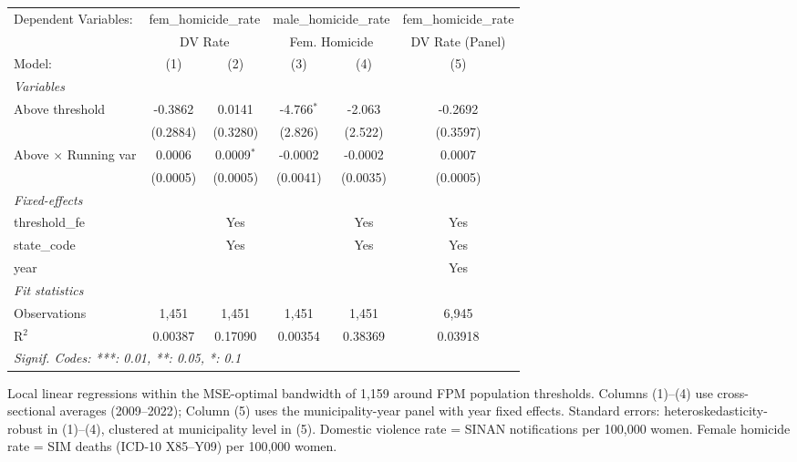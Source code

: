 
\begingroup
\centering
\begin{tabular}{lccccc}
   \tabularnewline \midrule \midrule
   Dependent Variables: & \multicolumn{2}{c}{fem\_homicide\_rate} & \multicolumn{2}{c}{male\_homicide\_rate} & fem\_homicide\_rate\\
    & \multicolumn{2}{c}{DV Rate} & \multicolumn{2}{c}{Fem. Homicide} & DV Rate (Panel) \\ 
   Model:                      & (1)      & (2)          & (3)          & (4)      & (5)\\  
   \midrule
   \emph{Variables}\\
   Above threshold             & -0.3862  & 0.0141       & -4.766$^{*}$ & -2.063   & -0.2692\\   
                               & (0.2884) & (0.3280)     & (2.826)      & (2.522)  & (0.3597)\\   
   Above $\times$ Running var  & 0.0006   & 0.0009$^{*}$ & -0.0002      & -0.0002  & 0.0007\\   
                               & (0.0005) & (0.0005)     & (0.0041)     & (0.0035) & (0.0005)\\   
   \midrule
   \emph{Fixed-effects}\\
   threshold\_fe               &          & Yes          &              & Yes      & Yes\\  
   state\_code                 &          & Yes          &              & Yes      & Yes\\  
   year                        &          &              &              &          & Yes\\  
   \midrule
   \emph{Fit statistics}\\
   Observations                & 1,451    & 1,451        & 1,451        & 1,451    & 6,945\\  
   R$^2$                       & 0.00387  & 0.17090      & 0.00354      & 0.38369  & 0.03918\\  
   \midrule \midrule
   \multicolumn{6}{l}{\emph{Signif. Codes: ***: 0.01, **: 0.05, *: 0.1}}\\
\end{tabular}
 
\par \raggedright 
Local linear regressions within the MSE-optimal bandwidth of 1,159 around FPM population thresholds. Columns (1)--(4) use cross-sectional averages (2009--2022); Column (5) uses the municipality-year panel with year fixed effects. Standard errors: heteroskedasticity-robust in (1)--(4), clustered at municipality level in (5). Domestic violence rate = SINAN notifications per 100,000 women. Female homicide rate = SIM deaths (ICD-10 X85--Y09) per 100,000 women.
\par\endgroup


